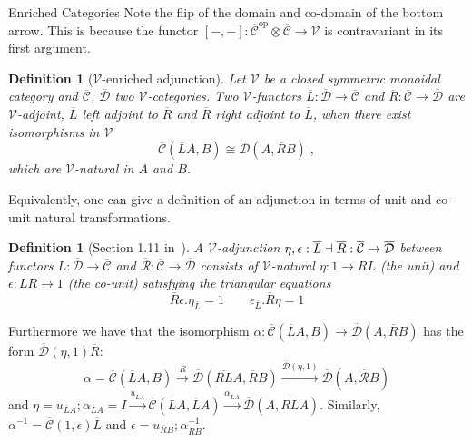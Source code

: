\documentclass[acmsmall, screen, nonacm]{acmart}
\newtheorem{definition}[theorem]{Definition}
\newcommand\enriched[1]{{\overline{\mathcal{#1}}}}
\begin{document}
\begin{section}{Enriched Categories}
Note the flip of the domain and co-domain of the bottom arrow.
This is because the functor $[-,-] : \enriched{C}^{\text{op}} \otimes \enriched{C} \to \mathcal{V}$ is contravariant in its first argument.

\begin{definition}[$\mathcal{V}$-enriched adjunction]
  Let $\mathcal{V}$ be a closed symmetric monoidal category and $\enriched{C}$, $\enriched{D}$ two $\mathcal{V}$-categories.
  Two $\mathcal{V}$-functors $\overline{L} : \enriched{D} \to \enriched{C}$ and $\overline{R} : \enriched{C} \to \enriched{D}$ are $\mathcal{V}$-adjoint, $\overline{L}$ left adjoint to $\overline{R}$ and $\overline{R}$ right adjoint to $\overline{L}$, when there exist isomorphisms in $\mathcal{V}$
  \[
  \enriched{C}(\overline{L}A,B) \cong \enriched{D}(A, \overline{R}B) \;,
  \]
  which are $\mathcal{V}$-natural in $A$ and $B$.
\end{definition}

Equivalently, one can give a definition of an adjunction in terms of unit and co-unit natural transformations.

\begin{definition}[Section 1.11 in~\cite{Kelly2022BASICCO}]
  A $\mathcal{V}$-adjunction $\eta, \epsilon: \overline{L} \;\reflectbox{$\vdash$}\; \overline{R} : \enriched{C} \to \enriched{D}$ between functors $L : \enriched{D} \to \enriched{C}$ and $\enriched{R} : \enriched{C} \to \enriched{D}$ consists of $\mathcal{V}$-natural $\eta : 1 \to RL$ (the \textit{unit}) and $\epsilon : LR \to 1$ (the \textit{co-unit}) satisfying the triangular equations
  \[
  \overline{R}\epsilon . \eta_{\overline{L}} = 1 \qquad \epsilon_{\overline{L}} . \overline{R} \eta = 1
  \]
\end{definition}
Furthermore we have that the isomorphism $\alpha : \enriched{C}(\overline{L}A,B) \to \enriched{D}(A, \overline{R}B)$ has the form $\enriched{D}(\eta, 1)\overline{R}$:
\[
  \alpha = \enriched{C}(\overline{L}A, B) \xrightarrow{\overline{R}} \enriched{D}(\overline{RL}A, \overline{R}B) \xrightarrow{\enriched{D}(\eta, 1)} \enriched{D}(A, \enriched{R}B)
\]
and $\eta = u_{\overline{L}A};\alpha_{\overline{L}A} = I \xrightarrow{u_{\overline{L}A}}\enriched{C}(\overline{L}A, \overline{L}A) \xrightarrow{\alpha_{\overline{L}A}} \enriched{D}(A,\overline{RL}A)$.
Similarly, $\alpha^{-1} = \enriched{C}(1,\epsilon)\overline{L}$ and $\epsilon = u_{\overline{R}B};\alpha^{-1}_{\overline{R}B}$.


\end{section}
\end{document}
